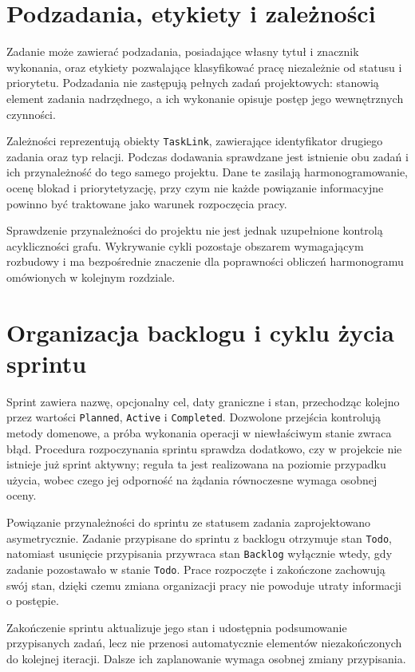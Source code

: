 \section{Podzadania, etykiety i zależności}

Zadanie może zawierać podzadania, posiadające własny tytuł i znacznik wykonania, oraz etykiety pozwalające klasyfikować pracę niezależnie od statusu i priorytetu. Podzadania nie zastępują pełnych zadań projektowych: stanowią element zadania nadrzędnego, a ich wykonanie opisuje postęp jego wewnętrznych czynności.

Zależności reprezentują obiekty \texttt{TaskLink}, zawierające identyfikator drugiego zadania oraz typ relacji. Podczas dodawania sprawdzane jest istnienie obu zadań i ich przynależność do tego samego projektu. Dane te zasilają harmonogramowanie, ocenę blokad i priorytetyzację, przy czym nie każde powiązanie informacyjne powinno być traktowane jako warunek rozpoczęcia pracy.

Sprawdzenie przynależności do projektu nie jest jednak uzupełnione kontrolą acykliczności grafu. Wykrywanie cykli pozostaje obszarem wymagającym rozbudowy i ma bezpośrednie znaczenie dla poprawności obliczeń harmonogramu omówionych w kolejnym rozdziale.

\section{Organizacja backlogu i cyklu życia sprintu}

Sprint zawiera nazwę, opcjonalny cel, daty graniczne i stan, przechodząc kolejno przez wartości \texttt{Planned}, \texttt{Active} i \texttt{Completed}. Dozwolone przejścia kontrolują metody domenowe, a próba wykonania operacji w niewłaściwym stanie zwraca błąd. Procedura rozpoczynania sprintu sprawdza dodatkowo, czy w projekcie nie istnieje już sprint aktywny; reguła ta jest realizowana na poziomie przypadku użycia, wobec czego jej odporność na żądania równoczesne wymaga osobnej oceny.

Powiązanie przynależności do sprintu ze statusem zadania zaprojektowano asymetrycznie. Zadanie przypisane do sprintu z backlogu otrzymuje stan \texttt{Todo}, natomiast usunięcie przypisania przywraca stan \texttt{Backlog} wyłącznie wtedy, gdy zadanie pozostawało w stanie \texttt{Todo}. Prace rozpoczęte i zakończone zachowują swój stan, dzięki czemu zmiana organizacji pracy nie powoduje utraty informacji o postępie.

Zakończenie sprintu aktualizuje jego stan i udostępnia podsumowanie przypisanych zadań, lecz nie przenosi automatycznie elementów niezakończonych do kolejnej iteracji. Dalsze ich zaplanowanie wymaga osobnej zmiany przypisania.

